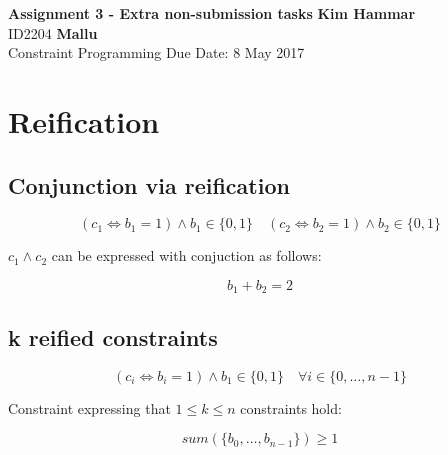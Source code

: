\documentclass[a4paper, 11pt]{article}
\begin{document}
\noindent
\large\textbf{Assignment 3  - Extra non-submission tasks} \hfill \textbf{Kim Hammar} \\
\normalsize ID2204 \hfill  \textbf{Mallu} \\
Constraint Programming \hfill Due Date: 8 May 2017\\

\section*{Reification}
\subsection*{Conjunction via reification}
$$(c_1 \iff b_1 = 1) \land b_1 \in \{0,1\} \quad (c_2 \iff b_2 = 1) \land b_2 \in \{0,1\}$$

$c_1 \land c_2$ can be expressed with conjuction as follows:

$$b_1 + b_2 = 2$$

\subsection*{k reified constraints}
$$(c_i \iff b_i = 1) \land b_1 \in \{0,1\} \quad \forall i \in \{0, \ldots, n-1\}$$

Constraint expressing that $1 \leq k \leq n$  constraints hold:

$$sum(\{b_0, \ldots, b_{n-1}\}) \geq 1$$


{}

\end{document}

